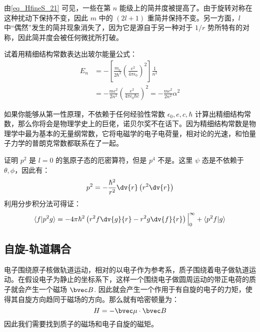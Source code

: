 由\autoref{eq_HfineS_21} 可见，一些在第 $n$ 能级上的简并度被提高了。由于旋转对称在这种扰动下保持不变，因此 $m$ 中的 $(2l+1)$ 重简并保持不变。另一方面，$l$ 中“偶然”发生的简并现象消失了，因为它是源自于另一种对于 $1/r$ 势所特有的对称，因此简并度会被任何微扰所打破。
\begin{example}{}
试着用精细结构常数表达出玻尔能量公式：
\begin{align}
E_n&=-\left[\frac {m_e}{2\hbar^{2}} \left(\frac {e^ {2}}{4\pi \epsilon_0}\right)^ {2}\right]  \frac {1}{n^2}\\
&=-\frac{mc^2}{2n^2}\left(\frac {e^{2}}{4\pi \epsilon_0\hbar c}\right)^2=-\frac{mc^2}{2n^2}\alpha^2
\end{align}
\end{example}

如果你能够从第一性原理，不依赖于任何经验性常数 $\epsilon_0,e,c,\hbar$ 计算出精细结构常数，那么你将会是物理学史上的巨佬，诺贝尔奖不在话下。因为精细结构常数是物理学中最为基本的无量纲常数，它将电磁学的电子电荷量，相对论的光速，和怕量子力学的普朗克常数都联系在了一起。

\begin{example}{}
证明 $p^2$ 是 $l=0$ 的氢原子态的厄密算符，但是 $p^4$ 不是。这里 $\psi$ 态是不依赖于 $\theta,\phi$，因此有：
\begin{equation}
p^2=-\frac{\hbar^2}{r^2}\dv{r}\left(r^2\dv{r}\right)
\end{equation}
利用分步积分法可得证：
\begin{equation}
\langle f|p^2g\rangle = -4\pi\hbar^2\left(r^2f\dv{g}{r}-r^2g\dv{f}{r}\right)\Big|_0^\infty+\langle p^2f|g\rangle
\end{equation}

\end{example}
\subsection{自旋-轨道耦合}
电子围绕原子核做轨道运动，相对的以电子作为参考系，质子围绕着电子做轨道运动。在假设电子为静止的坐标系下，这样一个围绕电子做圆周运动的带正电荷的质子就会产生一个磁场 $\bvec B$. 因此就会产生一个作用于有自旋的电子的力矩，使得其自旋方向趋同于磁场的方向。那么就有哈密顿量为：
\begin{equation}\label{eq_HfineS_26}
H=-\bvec\mu \cdot \bvec B
\end{equation}
因此我们需要找到质子的磁场和电子自旋的磁矩。


